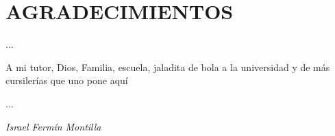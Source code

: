 \chapter*{AGRADECIMIENTOS}

...

A mi tutor, Dios, Familia, escuela, jaladita de bola a la universidad y de más cursilerías que uno pone aquí

...

\begin{flushright}
\textit{Israel Fermín Montilla}
\end{flushright}
